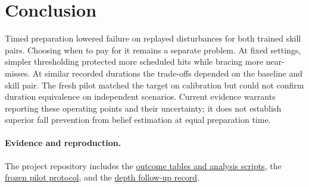 \documentclass[10pt,twocolumn]{article}
\begin{document}
\section{Conclusion}
Timed preparation lowered failure on replayed disturbances for both trained skill pairs. Choosing when to pay for it remains a separate problem. At fixed settings, simpler thresholding protected more scheduled hits while bracing more near-misses. At similar recorded durations the trade-offs depended on the baseline and skill pair. The fresh pilot matched the target on calibration but could not confirm duration equivalence on independent scenarios. Current evidence warrants reporting these operating points and their uncertainty; it does not establish superior fall prevention from belief estimation at equal preparation time.

\paragraph{Evidence and reproduction.} The project repository includes the \href{https://github.com/pchatla-arch/anticipatory-balance/tree/review/foresight-paper-20261121/analysis}{outcome tables and analysis scripts}, the \href{https://github.com/pchatla-arch/anticipatory-balance/blob/5a40555ca00f70cd22c2540437a4e2720dcc69d4/analysis/deterministic_cpu_pilot/protocol.json}{frozen pilot protocol}, and the \href{https://github.com/pchatla-arch/anticipatory-balance/blob/df8d5ee99036b243d62653d1c025ea2898ade16f/results/session_h_20261115T211850Z_1f77c1/report.md}{depth follow-up record}.
\end{document}
